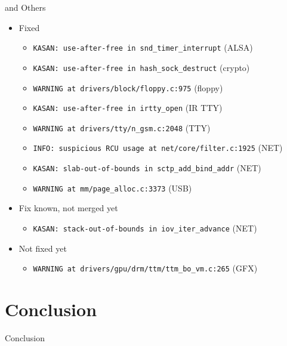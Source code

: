 \begin{frame}[fragile]{\syz and Others}

  \begin{itemize}
    \item Fixed
    \begin{itemize}
      \item \texttt{KASAN: use-after-free in snd\_timer\_interrupt} (ALSA)
      \item \texttt{KASAN: use-after-free in hash\_sock\_destruct} (crypto)
      \item \texttt{WARNING at drivers/block/floppy.c:975} (floppy)
      \item \texttt{KASAN: use-after-free in irtty\_open} (IR TTY)
      \item \texttt{WARNING at drivers/tty/n\_gsm.c:2048} (TTY)
      \item \texttt{INFO: suspicious RCU usage at net/core/filter.c:1925} (NET)
      \item \texttt{KASAN: slab-out-of-bounds in sctp\_add\_bind\_addr} (NET)
      \item \texttt{WARNING at mm/page\_alloc.c:3373} (USB)
    \end{itemize}

    \item Fix known, not merged yet
    \begin{itemize}
      \item \texttt{KASAN: stack-out-of-bounds in iov\_iter\_advance} (NET)
    \end{itemize}

    \item Not fixed yet
    \begin{itemize}
      \item \texttt{WARNING at drivers/gpu/drm/ttm/ttm\_bo\_vm.c:265} (GFX)
    \end{itemize}
  \end{itemize}

\end{frame}

\section{Conclusion}
\frame{\sectionpage}

\begin{frame}{Conclusion}

  \begin{center} \Large
  \end{center}

  \pause
  \bigskip
  \medskip

  \begin{center} \huge
  \end{center}

\end{frame}


